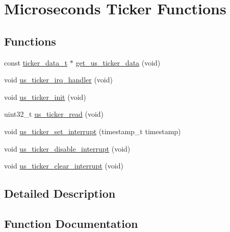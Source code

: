 \hypertarget{group___us_ticker}{}\section{Microseconds Ticker Functions}
\label{group___us_ticker}
\subsection*{Functions}
\begin{DoxyCompactItemize}
\item 
const \hyperlink{structticker__data__t}{ticker\+\_\+data\+\_\+t} $\ast$ \hyperlink{group___us_ticker_ga47032859c2f9f4b8591abc99ce332380}{get\+\_\+us\+\_\+ticker\+\_\+data} (void)
\item 
void \hyperlink{group___us_ticker_ga52d2b2c47d792442573e34403f9a10b1}{us\+\_\+ticker\+\_\+irq\+\_\+handler} (void)
\item 
void \hyperlink{group___us_ticker_ga829955267433ca8d04ac71f4e89c0404}{us\+\_\+ticker\+\_\+init} (void)
\item 
uint32\+\_\+t \hyperlink{group___us_ticker_ga023920c1e5030a84aa39d0be1de0aa0b}{us\+\_\+ticker\+\_\+read} (void)
\item 
void \hyperlink{group___us_ticker_gae7b69978fcf8ce8054597c87072896ce}{us\+\_\+ticker\+\_\+set\+\_\+interrupt} (timestamp\+\_\+t timestamp)
\item 
void \hyperlink{group___us_ticker_ga75e46157b1bbfe4f5594e33b49ff2605}{us\+\_\+ticker\+\_\+disable\+\_\+interrupt} (void)
\item 
void \hyperlink{group___us_ticker_ga373846a3122f86d7decbea5fab0590a9}{us\+\_\+ticker\+\_\+clear\+\_\+interrupt} (void)
\end{DoxyCompactItemize}


\subsection{Detailed Description}


\subsection{Function Documentation}
